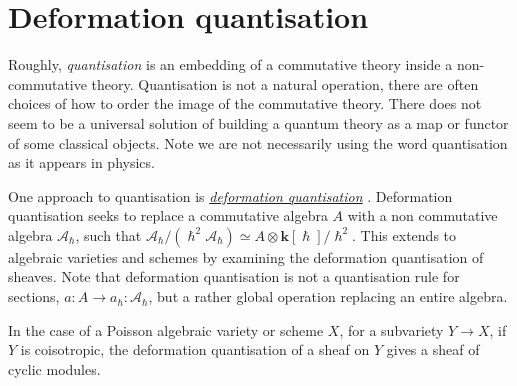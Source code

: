 \chapter{Deformation quantisation}
    
    Roughly, \emph{quantisation} is an embedding of a commutative theory inside a non-commutative theory. Quantisation is not a natural operation, there are often choices of how to order the image of the commutative theory.
    There does not seem to be a universal solution of building a quantum theory as a map or functor of some classical objects.  Note we are not necessarily using the word quantisation as it appears in physics.
    
    
    
    
    One approach to quantisation is \emph{\hyperref[defn:def_quant]{deformation quantisation}} \cite{chen_thesis,gunningham, k_defquant, b_defquant, quant_for_phys}. Deformation quantisation seeks to replace a commutative algebra \(A\) with a non commutative algebra \( \mathcal{A}_{\hslash}\), such that \( \mathcal{A}_{\hslash} / ( \hslash^2 \mathcal{A}_{\hslash}) \simeq A \otimes \mathbf{k}[\hslash]/\hslash^2\). This extends to algebraic varieties and schemes by examining the deformation quantisation of sheaves. Note that deformation quantisation is not a quantisation rule for sections, \(a : A \rightarrow a_\hslash : \mathcal{A}_{\hslash}\), but a rather global operation replacing an entire algebra.
    
    

    In the case of a Poisson algebraic variety or scheme \( X\), for a subvariety \( Y \rightarrow X\), if \(Y\) is coisotropic, the deformation quantisation of a sheaf on \(Y\) gives a sheaf of cyclic modules.
    
    
